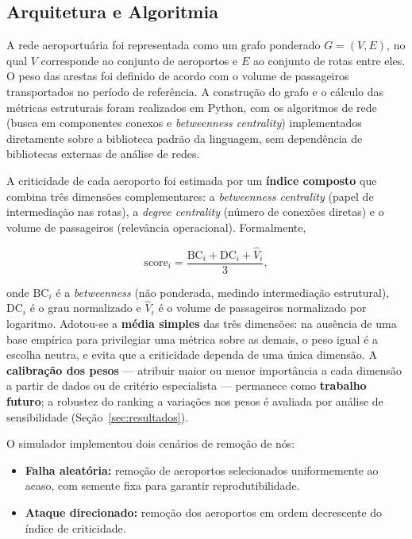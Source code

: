 \documentclass[12pt,a4paper]{article}
\begin{document}
\subsection{Arquitetura e Algoritmia}

A rede aeroportuária foi representada como um grafo ponderado $G = (V, E)$, no qual $V$
corresponde ao conjunto de aeroportos e $E$ ao conjunto de rotas entre eles. O peso das arestas
foi definido de acordo com o volume de passageiros transportados no período de referência. A
construção do grafo e o cálculo das métricas estruturais foram realizados em Python, com os
algoritmos de rede (busca em componentes conexos e \textit{betweenness centrality}) implementados
diretamente sobre a biblioteca padrão da linguagem, sem dependência de bibliotecas externas de
análise de redes.

A criticidade de cada aeroporto foi estimada por um \textbf{índice composto} que combina três
dimensões complementares: a \textit{betweenness centrality} (papel de intermediação nas rotas), a
\textit{degree centrality} (número de conexões diretas) e o volume de passageiros (relevância
operacional). Formalmente,

\begin{equation}
  \text{score}_i = \frac{\text{BC}_i + \text{DC}_i + \widehat{V}_i}{3},
\end{equation}

\noindent onde $\text{BC}_i$ é a \textit{betweenness} (não ponderada, medindo intermediação
estrutural), $\text{DC}_i$ é o grau normalizado e $\widehat{V}_i$ é o volume de passageiros
normalizado por logaritmo. Adotou-se a \textbf{média simples} das três dimensões: na ausência de
uma base empírica para privilegiar uma métrica sobre as demais, o peso igual é a escolha neutra,
e evita que a criticidade dependa de uma única dimensão. A \textbf{calibração dos pesos} ---
atribuir maior ou menor importância a cada dimensão a partir de dados ou de critério especialista
--- permanece como \textbf{trabalho futuro}; a robustez do ranking a variações nos pesos é
avaliada por análise de sensibilidade (Seção~\ref{sec:resultados}).

O simulador implementou dois cenários de remoção de nós:

\begin{itemize}[leftmargin=*]
  \item \textbf{Falha aleatória:} remoção de aeroportos selecionados uniformemente ao acaso, com
        semente fixa para garantir reprodutibilidade.
  \item \textbf{Ataque direcionado:} remoção dos aeroportos em ordem decrescente do índice de
        criticidade.
\end{itemize}
\end{document}
